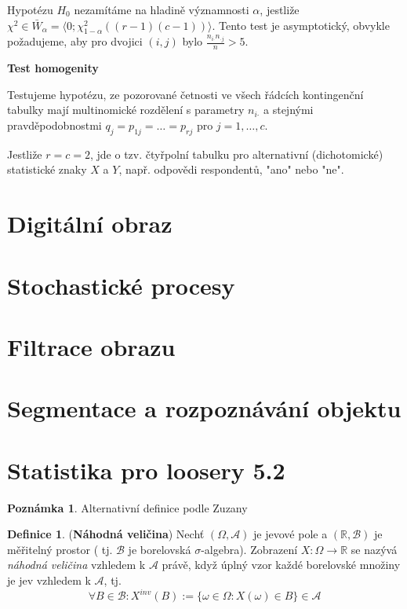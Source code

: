 \documentclass[a4]{report}
\theoremstyle{definition}
\newtheorem{definition}{Definice}[section]
\newtheorem{notes}{Poznámka}[section]
\begin{document}
{Hypotézu $H_0$ nezamítáme na hladině významnosti $\alpha$, jestliže $\chi^2 \in \bar{W}_{\alpha} = \langle 0; \chi^2_{1 - \alpha} ((r - 1)(c - 1)) \rangle$. Tento test je asymptotický, obvykle požadujeme, aby pro dvojici $(i,j)$ bylo $\frac{n_{i \boldsymbol{\cdot}} n_{\boldsymbol{\cdot} j}}{n} > 5$.


\textbf{Test homogenity}

Testujeme hypotézu, ze pozorované četnosti ve všech řádcích kontingenční tabulky mají multinomické rozdělení s parametry $n_{i \boldsymbol{\cdot}}$ a stejnými pravděpodobnostmi $q_j = p_{1j} = \ldots = p_{rj}$ pro $j = 1, \ldots, c$.

Jestliže $r = c = 2$, jde o tzv. čtyřpolní tabulku pro alternativní (dichotomické) statistické znaky $X$ a $Y$, např. odpovědi respondentů, "ano" nebo "ne".

\section{Digitální obraz}

\section{Stochastické procesy}

\section{Filtrace obrazu}

\section{Segmentace a rozpoznávání objektu}



\section{Statistika pro loosery 5.2}
\begin{notes}
Alternativní definice podle Zuzany
\end{notes}
\begin{definition}{(\textbf{Náhodná veličina})}
Nechť $( \Omega, \mathcal{A}) $ je jevové pole a $(\mathbb{R}, \mathcal{B})$ je měřitelný prostor ( tj. $\mathcal{B}$ je borelovská $\sigma$-algebra). Zobrazení $X:\Omega \rightarrow \mathbb{R}$ se nazývá \textit{náhodná veličina} vzhledem k $\mathcal{A}$ právě, když úplný vzor každé borelovské množiny je jev vzhledem k $\mathcal{A}$, tj.
\begin{equation*}
\forall B \in \mathcal{B}: X^{inv }(B):=\{\omega\in \Omega : X(\omega)\in B \}\in \mathcal{A}
\end{equation*}
\end{definition}

}
\end{document}
